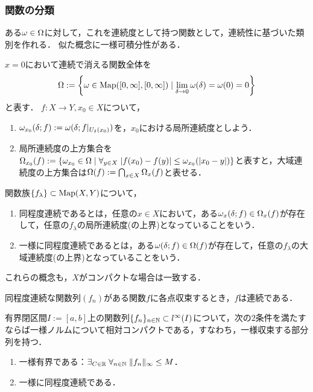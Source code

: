 \documentclass[uplatex,dvipdfmx]{jsreport}
\begin{document}
\subsubsection{関数の分類}

\begin{tcolorbox}[colframe=ForestGreen, colback=ForestGreen!10!white,breakable,colbacktitle=ForestGreen!40!white,coltitle=black,fonttitle=\bfseries\sffamily,
title=]
    ある$\omega\in\Omega$に対して，これを連続度として持つ関数として，連続性に基づいた類別を作れる．
    似た概念に一様可積分性がある．
\end{tcolorbox}

\begin{definition}
    $x=0$において連続で消える関数全体を
    \[\Omega:=\left\{\omega\in\mathrm{Map}([0,\infty],[0,\infty])\mid\lim_{\delta\to0}\omega(\delta)=\omega(0)=0\right\}\]
    と表す．
    $f:X\to Y,x_0\in X$について，
    \begin{enumerate}
        \item $\omega_{x_0}(\delta;f):=\omega(\delta;f|_{U_{\delta}(x_0)})$を，$x_0$における局所連続度としよう．
        \item 局所連続度の上方集合を$\Omega_{x_0}(f):=\left\{\omega_{x_0}\in\Omega\mid\forall_{y\in X}\;\lvert f(x_0)-f(y)\rvert\le\omega_{x_0}(\lvert x_0-y\rvert)\right\}$と表すと，大域連続度の上方集合は$\Omega(f):=\bigcap_{x\in X}\Omega_x(f)$と表せる．
    \end{enumerate}
\end{definition}

\begin{definition}
    関数族$\{f_\lambda\}\subset\mathrm{Map}(X,Y)$について，
    \begin{enumerate}
        \item 同程度連続であるとは，任意の$x\in X$において，ある$\omega_x(\delta;f)\in\Omega_x(f)$が存在して，任意の$f_\lambda$の局所連続度(の上界)となっていることをいう．
        \item 一様に同程度連続であるとは，ある$\omega(\delta;f)\in\Omega(f)$が存在して，任意の$f_\lambda$の大域連続度(の上界)となっていることをいう．
    \end{enumerate}
    これらの概念も，$X$がコンパクトな場合は一致する．
\end{definition}

\begin{lemma}
    同程度連続な関数列$(f_n)$がある関数$f$に各点収束するとき，$f$は連続である．
\end{lemma}

\begin{theorem}
    有界閉区間$I:=[a,b]$上の関数列$\{f_n\}_{n\in\mathbb{N}}\subset l^\infty(I)$について，次の2条件を満たすならば一様ノルムについて相対コンパクトである，すなわち，一様収束する部分列を持つ．
    \begin{enumerate}
        \item 一様有界である：$\exists_{C\in\mathbb{R}}\;\forall_{n\in\mathbb{N}}\;\|f_n\|_\infty\le M$．
        \item 一様に同程度連続である．
    \end{enumerate}
\end{theorem}
\end{document}
